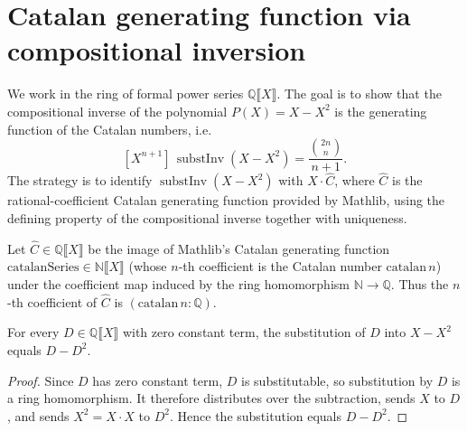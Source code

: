 


\section{Catalan generating function via compositional inversion}

We work in the ring of formal power series $\mathbb{Q}\llbracket X\rrbracket$. The goal is to
show that the compositional inverse of the polynomial $P(X) = X - X^2$ is the
generating function of the Catalan numbers, i.e.
\[
  [X^{n+1}]\,\operatorname{substInv}(X - X^2) = \frac{\binom{2n}{n}}{n+1}.
\]
The strategy is to identify $\operatorname{substInv}(X - X^2)$ with $X \cdot \hat C$, where
$\hat C$ is the rational-coefficient Catalan generating function provided by Mathlib, using
the defining property of the compositional inverse together with uniqueness.

\begin{definition}
    \label{def:catalan-series-rat}
    Let $\hat C \in \mathbb{Q}\llbracket X\rrbracket$ be the image of Mathlib's Catalan
    generating function $\mathrm{catalanSeries} \in \mathbb{N}\llbracket X\rrbracket$ (whose
    $n$-th coefficient is the Catalan number $\mathrm{catalan}\,n$) under the coefficient map
    induced by the ring homomorphism $\mathbb{N} \to \mathbb{Q}$. Thus the $n$-th coefficient
    of $\hat C$ is $(\mathrm{catalan}\,n : \mathbb{Q})$.
\end{definition}

\begin{lemma}
    \label{lem:subst-X-sub-X-sq}
    \leanok
    For every $D \in \mathbb{Q}\llbracket X\rrbracket$ with zero constant term, the substitution
    of $D$ into $X - X^2$ equals $D - D^2$.
\end{lemma}
\begin{proof}
    Since $D$ has zero constant term, $D$ is substitutable, so substitution by $D$ is a ring
    homomorphism. It therefore distributes over the subtraction, sends $X$ to $D$, and sends
    $X^2 = X \cdot X$ to $D^2$. Hence the substitution equals $D - D^2$.
\end{proof}

